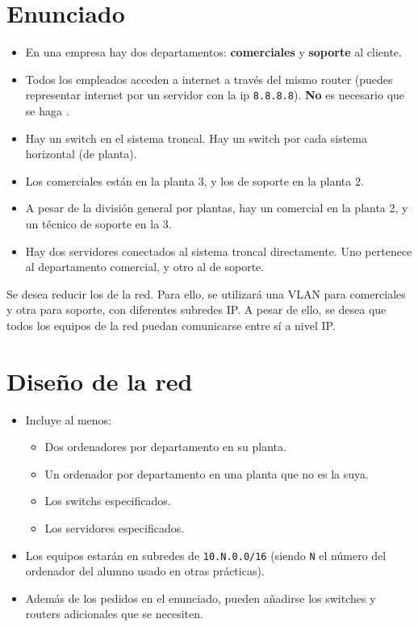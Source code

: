 \section{Enunciado}
\begin{itemize}
\item En una empresa hay dos departamentos: \textbf{comerciales} y \textbf{soporte} al cliente.
\item Todos los empleados acceden a internet a través del mismo router (puedes representar internet por un servidor con la ip \texttt{8.8.8.8}). \textbf{No} es necesario que se haga .
\item Hay un switch en el sistema troncal. Hay un switch por cada sistema horizontal (de planta).
\item Los comerciales están en la planta 3, y los de soporte en la planta 2.
\item A pesar de la división general por plantas, hay un comercial en la planta 2, y un técnico de soporte en la 3.
\item Hay dos servidores conectados al sistema troncal directamente. Uno pertenece al departamento comercial, y otro al de soporte.
\end{itemize}
Se desea reducir los  de la red. Para ello, se utilizará una VLAN para comerciales y otra para soporte, con diferentes subredes IP.
A pesar de ello, se desea que todos los equipos de la red puedan comunicarse entre sí a nivel IP.
\section{Diseño de la red}
\begin{itemize}
\item Incluye al menos:
  \begin{itemize}
  \item Dos ordenadores por departamento en su planta.
  \item Un ordenador por departamento en una planta que no es la suya.
  \item Los switchs especificados.
  \item Los servidores especificados.
  \end{itemize}
\item Los equipos estarán en subredes de \texttt{10.N.0.0/16} (siendo \texttt{N} el número del ordenador del alumno usado en otras prácticas).
\item Además de los pedidos en el enunciado, pueden añadirse los switches y routers adicionales que se necesiten.  
\end{itemize}

